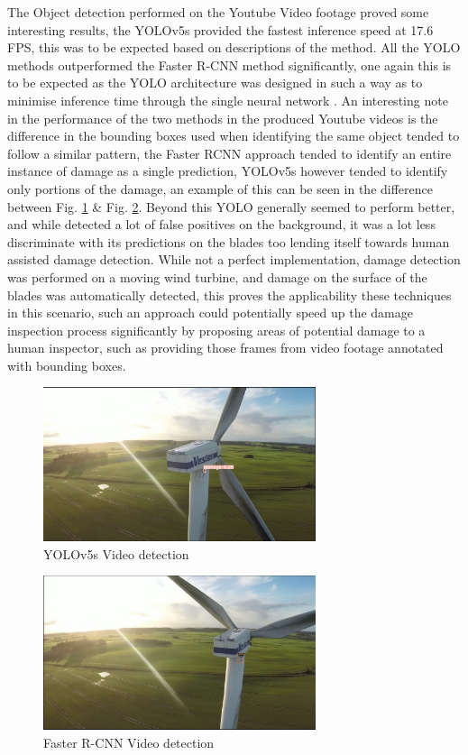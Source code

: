 \documentclass[conference]{IEEEtran}
\begin{document}
The Object detection performed on the Youtube Video footage proved some interesting results, the YOLOv5s provided the fastest inference speed at 17.6 FPS, this was to be expected based on descriptions of the method. All the YOLO methods outperformed the Faster R-CNN method significantly, one again this is to be expected as the YOLO architecture was designed in such a way as to minimise inference time through the single neural network \cite{redmon2016you}. An interesting note in the performance of the two methods in the produced Youtube videos is the difference in the bounding boxes used when identifying the same object tended to follow a similar pattern, the Faster RCNN approach tended to identify an entire instance of damage as a single prediction, YOLOv5s however tended to identify only portions of the damage, an example of this can be seen in the difference between Fig. \ref{fig:yolvid} \& Fig. \ref{fig:fasvid}. Beyond this YOLO generally seemed to perform better, and while detected a lot of false positives on the background, it was a lot less discriminate with its predictions on the blades too lending itself towards human assisted damage detection. While not a perfect implementation, damage detection was performed on a moving wind turbine, and damage on the surface of the blades was automatically detected, this proves the applicability these techniques in this scenario, such an approach could potentially speed up the damage inspection process significantly by proposing areas of potential damage to a human inspector, such as providing those frames from video footage annotated with bounding boxes.

\begin{figure}[H]
    \centering
    \includegraphics[width=8cm]{Images/YOLOVid.png}
    \caption{YOLOv5s Video detection}
    \label{fig:yolvid}
\end{figure}

\begin{figure}[H]
    \centering
    \includegraphics[width=8cm]{Images/FastVid.png}
    \caption{Faster R-CNN Video detection}
    \label{fig:fasvid}
\end{figure}
\end{document}
